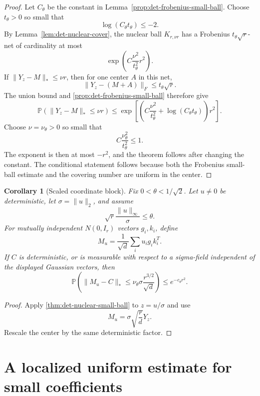 \documentclass[11pt]{article}
\numberwithin{equation}{section}
\newtheorem{corollary}[theorem]{Corollary}
\theoremstyle{definition}
\theoremstyle{remark}
\newcommand{\Pp}{\mathbb P}
\newcommand{\1}{\boldsymbol 1}
\begin{document}
\begin{aiblock}
\begin{proof}
  Let $C_\theta$ be the constant in
  Lemma~\ref{prop:det-frobenius-small-ball}. Choose $t_\theta>0$
  so small that
  \[
    \log(C_\theta t_\theta)\le-2.
  \]
  By Lemma~\ref{lem:det-nuclear-cover}, the nuclear ball
  $K_{r,\nu r}$ has a Frobenius $t_\theta\sqrt r$-net of
  cardinality at most
  \[
    \exp\left(C\frac{\nu^2}{t_\theta^2}r^2\right).
  \]
  If $\|Y_z-M\|_*\le\nu r$, then for one center $A$ in
  this net,
  \[
    \|Y_z-(M+A)\|_F\le t_\theta\sqrt r.
  \]
  The union bound and
  \cref{prop:det-frobenius-small-ball} therefore give
  \[
    \Pp(\|Y_z-M\|_*\le\nu r) \le \exp\left[
    \left(C\frac{\nu^2}{t_\theta^2}
    +\log(C_\theta t_\theta)\right)r^2 \right].
  \]
  Choose $\nu=\nu_\theta>0$ so small that
  \[
    C\frac{\nu_\theta^2}{t_\theta^2}\le1.
  \]
  The exponent is then at most $-r^2$, and the theorem
  follows after changing the constant. The conditional
  statement follows because both the Frobenius small-ball
  estimate and the covering number are uniform in the
  center.
\end{proof}

\begin{corollary}[Scaled coordinate block]
  \label{cor:det-scaled-block}
  Fix $0<\theta<1/\sqrt2$. Let $u\ne0$ be deterministic,
  let $\sigma=\|u\|_2$, and assume
  \[
    \sqrt r\frac{\|u\|_\infty}{\sigma}\le\theta.
  \]
  For mutually independent $N(0,I_r)$ vectors $g_i,k_i$,
  define
  \[
    M_u=\frac1{\sqrt d}\sum_i u_ig_ik_i^T.
  \]
  If $C$ is deterministic, or is measurable with respect
  to a sigma-field independent of the displayed Gaussian
  vectors, then
  \[
    \Pp\left( \|M_u-C\|_*\le
    \nu_\theta\sigma\frac{r^{3/2}}{\sqrt d} \right) \le
    e^{-c_\theta r^2}.
  \]
\end{corollary}

\begin{proof}
  Apply \cref{thm:det-nuclear-small-ball} to
  $z=u/\sigma$ and use
  \[
    M_u=\sigma\sqrt{\frac rd}Y_z.
  \]
  Rescale the center by the same deterministic factor.
\end{proof}    
\end{aiblock}



\section{A localized uniform estimate for small
  coefficients}\label{expert-localized-module}
\end{document}
